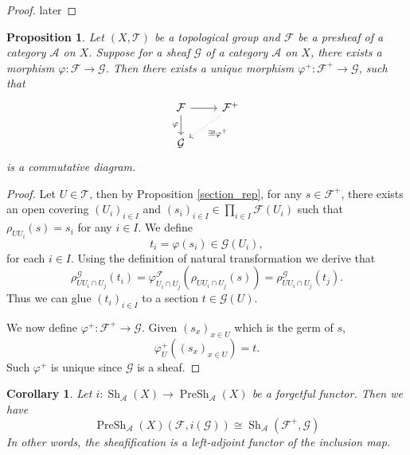 \documentclass{article}
\newtheorem{proposition}{Proposition}[section]
\newtheorem{corollary}{Corollary}[section]
\numberwithin{equation}{section}
\DeclareMathOperator{\PreSh}{PreSh}
\DeclareMathOperator{\Sh}{Sh}
\begin{document}
\begin{proof}
later
\end{proof}

\begin{proposition}
Let $(X,\mathcal{T})$ be a topological group and $\mathcal{F}$ be a presheaf of a category $\mathcal{A}$ on $X$. Suppose for a sheaf $\mathcal{G}$ of a category $\mathcal{A}$ on $X$, there exists a morphism $\varphi:\mathcal{F}\to\mathcal{G}$. Then there exists a unique morphism $\varphi^+:\mathcal{F}^+\to\mathcal{G}$, such that
\[
\begin{tikzcd}
\mathcal{F} \arrow[d, "\varphi"'] \arrow[r] & \mathcal{F}^+ \arrow[ld, "\exists!\varphi^+", dotted] \\
\mathcal{G}                                 &                                                      
\end{tikzcd}
\]
is a commutative diagram.
\label{sheaf_morphism_universal_property}
\end{proposition}

\begin{proof}
Let $U\in\mathcal{T}$, then by Proposition \ref{section_rep}, for any $s\in\mathcal{F}^+$, there exists an open covering $(U_i)_{i\in I}$ and $(s_i)_{i\in I}\in\prod_{i\in I}\mathcal{F}(U_i)$ such that $\rho_{UU_i}(s)=s_i$ for any $i\in I$. We define
\begin{equation*}
t_i = \varphi(s_i)\in\mathcal{G}(U_i),
\end{equation*}
for each $i\in I$. Using the definition of natural transformation we derive that
\begin{equation*}
\rho^{\mathcal{G}}_{UU_i\cap U_j}(t_i) = \varphi^{\mathcal{F}}_{U_i\cap U_j}(\rho_{UU_i\cap U_j}(s))=\rho^{\mathcal{G}}_{UU_i\cap U_j}(t_j).
\end{equation*}
Thus we can glue $(t_i)_{i\in I}$ to a section $t\in\mathcal{G}(U)$.\\
\par We now define $\varphi^+:\mathcal{F}^+\to\mathcal{G}$. Given $(s_x)_{x\in U}$ which is the germ of $s$,
\begin{equation*}
\varphi^+_{U}((s_x)_{x\in U}) = t.
\end{equation*}
Such $\varphi^+$ is unique since $\mathcal{G}$ is a sheaf.
\end{proof}

\begin{corollary}
Let $i:\Sh_\mathcal{A}(X)\to\PreSh_\mathcal{A}(X)$ be a forgetful functor. Then we have
\begin{equation*}
\PreSh_\mathcal{A}(X)(\mathcal{F},i(\mathcal{G})) \cong \Sh_{\mathcal{A}}(\mathcal{F}^+,\mathcal{G})
\end{equation*}
In other words, the sheafification is a left-adjoint functor of the inclusion map.
\end{corollary}
\end{document}
